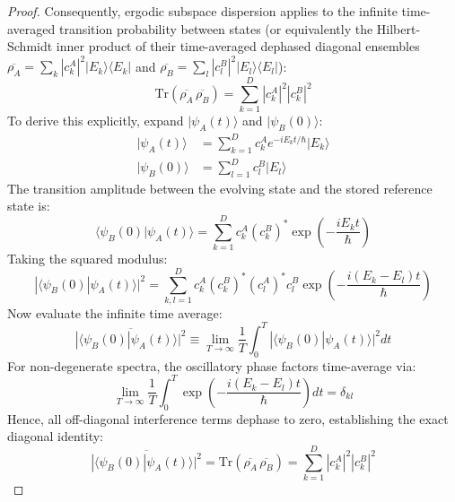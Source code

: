 \documentclass[10pt,twocolumn,3p]{article}
\begin{document}
\begin{proof}
Consequently, ergodic subspace dispersion applies to the infinite time-averaged transition probability between states (or equivalently the Hilbert-Schmidt inner product of their time-averaged dephased diagonal ensembles $\overline{\rho_A} = \sum_k |c_k^A|^2 |E_k\rangle\langle E_k|$ and $\overline{\rho_B} = \sum_l |c_l^B|^2 |E_l\rangle\langle E_l|$):
\begin{equation}
    \text{Tr}(\overline{\rho_A} \, \overline{\rho_B}) = \sum_{k=1}^D |c_k^A|^2 |c_k^B|^2
\end{equation}
To derive this explicitly, expand $|\psi_A(t)\rangle$ and $|\psi_B(0)\rangle$:
\begin{align}
    |\psi_A(t)\rangle &= \sum_{k=1}^D c_k^A e^{-i E_k t / \hbar} |E_k\rangle \\
    |\psi_B(0)\rangle &= \sum_{l=1}^D c_l^B |E_l\rangle
\end{align}
The transition amplitude between the evolving state and the stored reference state is:
\begin{equation}
    \langle \psi_B(0) | \psi_A(t) \rangle = \sum_{k=1}^D c_k^A (c_k^B)^* \exp\left( -\frac{i E_k t}{\hbar} \right)
\end{equation}
Taking the squared modulus:
\begin{equation}
    |\langle \psi_B(0) | \psi_A(t) \rangle|^2 = \sum_{k,l=1}^D c_k^A (c_k^B)^* (c_l^A)^* c_l^B \exp\left( -\frac{i (E_k - E_l) t}{\hbar} \right)
\end{equation}
Now evaluate the infinite time average:
\begin{equation}
    \overline{|\langle \psi_B(0) | \psi_A(t) \rangle|^2} \equiv \lim_{T \to \infty} \frac{1}{T} \int_0^T |\langle \psi_B(0) | \psi_A(t) \rangle|^2 dt
\end{equation}
For non-degenerate spectra, the oscillatory phase factors time-average via:
\begin{equation}
    \lim_{T \to \infty} \frac{1}{T} \int_0^T \exp\left( -\frac{i (E_k - E_l) t}{\hbar} \right) dt = \delta_{kl}
\end{equation}
Hence, all off-diagonal interference terms dephase to zero, establishing the exact diagonal identity:
\begin{equation}
    \overline{|\langle \psi_B(0) | \psi_A(t) \rangle|^2} = \text{Tr}(\overline{\rho_A} \, \overline{\rho_B}) = \sum_{k=1}^D |c_k^A|^2 |c_k^B|^2
    \label{eq:diagonal_sum}
\end{equation}


\end{proof}
\end{document}
